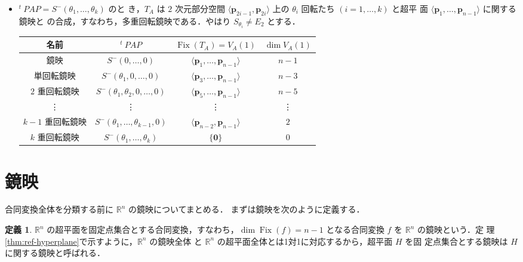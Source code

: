 \documentclass[11pt, uplatex, dvipdfmx, titlepage]{jsarticle}
\newcommand{\trs}[1]{{}^{t}~\!\!#1}
\DeclareMathOperator{\Fix}{Fix}
\theoremstyle{definition}
\newtheorem*{definition}{定義}
\begin{document}
\begin{itemize}
\begin{table}[h]
\begin{tabular}[h]{c|c|c|c}
    \end{tabular}
  \end{table}
\item $\trs{P}AP = S^{-}(\theta_1, \ldots, \theta_k)$ のと
  き，$T_A$ は $2$ 次元部分空間 $\langle \bm{p}_{2i-1},
  \bm{p}_{2i}\rangle$ 上の $\theta_i$ 回転たち $(i=1, \ldots, k)$ と超平
  面 $\langle \bm{p}_1, \ldots, \bm{p}_{n-1}\rangle$ に関する鏡映と
  の合成，すなわち，多重回転鏡映である．やはり $S_{\theta_i} \neq E_2$ とする．
  \begin{table}[h]
    \centering
    \begin{tabular}[h]{c|c|c|c}
      名前 & $\trs{P}AP$ & $\Fix(T_A)=V_A(1)$ & $\dim V_A(1)$\\ \hline
      鏡映 & $S^{-}(0, \ldots, 0)$ & $\langle \bm{p}_1, \ldots, \bm{p}_{n-1}\rangle$ & $n-1$\\
      単回転鏡映 & $S^{-}(\theta_1, 0, \ldots, 0)$
                         & $\langle \bm{p}_3, \ldots, \bm{p}_{n-1}\rangle$ & $n-3$\\
      $2$ 重回転鏡映 & $S^{-}(\theta_1, \theta_2, 0, \ldots, 0)$
                         & $\langle \bm{p}_5, \ldots, \bm{p}_{n-1}\rangle$ & $n-5$\\
      \vdots & \vdots & \vdots & \vdots\\
      $k-1$ 重回転鏡映 & $S^{-}(\theta_1, \ldots, \theta_{k-1},0)$
                         & $\langle \bm{p}_{n-2}, \bm{p}_{n-1}\rangle$ & $2$\\
      $k$ 重回転鏡映 & $S^{-}(\theta_1, \ldots, \theta_k)$ & $\{\bm{0}\}$ & $0$
    \end{tabular}
  \end{table}
\end{itemize}

\newpage


\section{鏡映}\label{sec:reflection}

合同変換全体を分類する前に $\mathbb{R}^n$ の鏡映についてまとめる．
まずは鏡映を次のように定義する．

\begin{definition}
  $\mathbb{R}^n$ の超平面を固定点集合とする合同変換，すなわち，$\dim
  \Fix(f)=n-1$ となる合同変換 $f$ を $\mathbb{R}^n$ の鏡映という．定
  理\ref{thm:ref-hyperplane}で示すように，$\mathbb{R}^n$ の鏡映全体
  と $\mathbb{R}^n$ の超平面全体とは1対1に対応するから，超平面 $H$ を固
  定点集合とする鏡映は $H$ に関する鏡映と呼ばれる．
\end{definition}
\end{document}
